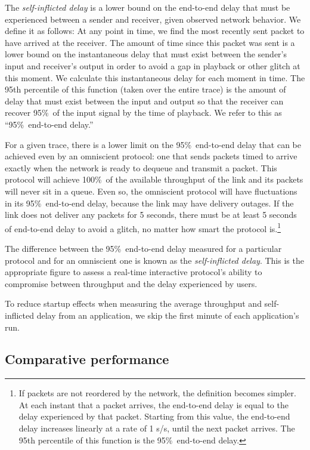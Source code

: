 The {\em self-inflicted delay} is a lower bound on the end-to-end
delay that must be experienced between a sender and receiver, given
observed network behavior. We define it as follows: At any point in
time, we find the most recently sent packet to have arrived at the
receiver. The amount of time since this packet was sent is a lower
bound on the instantaneous delay that must exist between the sender's
input and receiver's output in order to avoid a gap in playback or
other glitch at this moment. We calculate this instantaneous delay for
each moment in time. The 95th percentile of this function (taken over the
entire trace) is the amount of delay that must exist between the input
and output so that the receiver can recover 95\%~of the input signal
by the time of playback. We refer to this as ``95\%~end-to-end
delay.''

For a given trace, there is a lower limit on the 95\%~end-to-end delay
that can be achieved even by an omniscient protocol: one that sends
packets timed to arrive exactly when the network is ready to dequeue
and transmit a packet. This protocol will achieve
100\%~of the available throughput of the link and its packets will
never sit in a queue. Even so, the omniscient protocol will have
fluctuations in its 95\%~end-to-end delay, because the link may have
delivery outages. If the link does not deliver any packets for 5
seconds, there must be at least 5 seconds of end-to-end delay to avoid
a glitch, no matter how smart the protocol is.\footnote{If packets are
  not reordered by the network, the definition becomes simpler. At
  each instant that a packet arrives, the end-to-end delay is equal to
  the delay experienced by that packet. Starting from this value, the
  end-to-end delay increases linearly at a rate of 1 s/s, until the
  next packet arrives. The 95th percentile of this function is the
  95\%~end-to-end delay.}

The difference between the 95\%~end-to-end delay measured for a
particular protocol and for an omniscient one is known as the
\emph{self-inflicted delay}. This is the appropriate figure to assess
a real-time interactive protocol's ability to compromise between
throughput and the delay experienced by users.

To reduce startup effects when measuring the average throughput and
self-inflicted delay from an application, we skip the first minute of
each application's run.

\subsection{Comparative performance}

